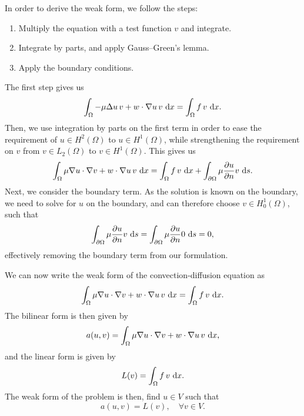 In order to derive the weak form, we follow the steps:
\begin{enumerate}
    \item Multiply the equation with a test function $v$ and integrate.

    \item Integrate by parts, and apply Gauss--Green's lemma. %

    \item Apply the boundary conditions.
\end{enumerate}
The first step gives us
\begin{equation}
    \int_\Omega -\mu \Delta u \, v + w \cdot \nabla u \, v \, \mathop{}\!\mathrm{d} x = \int_\Omega f \, v \, \mathop{}\!\mathrm{d} x.
\end{equation}
Then, we use integration by parts on the first term in order to ease the requirement of $u \in H^2(\Omega)$ to $u \in H^1(\Omega)$, while strengthening the requirement on $v$ from $v \in L_2(\Omega)$ to $v \in H^1(\Omega)$.
This gives us
\begin{equation}
    \int_{\Omega} \mu \nabla u \cdot \nabla v  + w \cdot \nabla u \, v \, \mathop{}\!\mathrm{d} x = \int_{\Omega} f \, v \, \mathop{}\!\mathrm{d} x + \int_{\partial\Omega} \mu \frac{\partial u}{\partial n} v \, \mathop{}\!\mathrm{d} s.
\end{equation}
Next, we consider the boundary term.
As the solution is known on the boundary, we need to solve for $u$ on the boundary, and can therefore choose $v \in H_0^1(\Omega)$, such that
\begin{equation}
    \int_{\partial\Omega} \mu \frac{\partial u}{\partial n} v \, \mathop{}\!\mathrm{d} s
    = \int_{\partial\Omega} \mu \frac{\partial u}{\partial n} 0 \, \mathop{}\!\mathrm{d} s = 0,
\end{equation}
effectively removing the boundary term from our formulation.

We can now write the weak form of the convection-diffusion equation as
\begin{equation}
    \int_{\Omega} \mu \nabla u \cdot \nabla v + w \cdot \nabla u \, v \, \mathop{}\!\mathrm{d} x = \int_{\Omega} f \, v \, \mathop{}\!\mathrm{d} x.
\end{equation}
The bilinear form is then given by
\begin{equation}
    a(u,v) = \int_{\Omega} \mu \nabla u \cdot \nabla v + w \cdot \nabla u \, v \, \mathop{}\!\mathrm{d} x,
\end{equation}
and the linear form is given by
\begin{equation}
    L(v) = \int_{\Omega} f \, v \, \mathop{}\!\mathrm{d} x.
\end{equation}
The weak form of the problem is then, find $u \in V$ such that
\begin{equation}
    a(u,v) = L(v), \quad \forall v \in V.
\end{equation}

